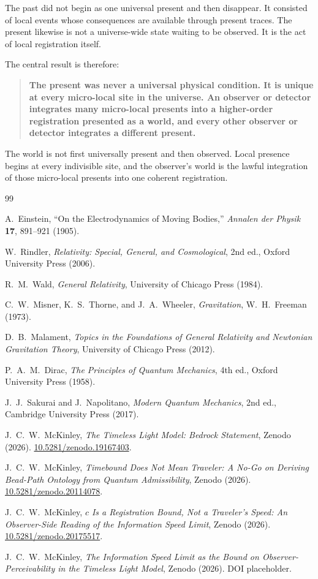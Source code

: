 \documentclass[12pt,onecolumn]{article}
\newcommand{\doi}[1]{\href{https://doi.org/#1}{#1}}
\begin{document}
The past did not begin as one universal present and then disappear. It consisted of local events whose consequences are available through present traces. The present likewise is not a universe-wide state waiting to be observed. It is the act of local registration itself.

The central result is therefore:

\begin{quote}
\textbf{The present was never a universal physical condition. It is unique at every micro-local site in the universe. An observer or detector integrates many micro-local presents into a higher-order registration presented as a world, and every other observer or detector integrates a different present.}
\end{quote}

The world is not first universally present and then observed. Local presence begins at every indivisible site, and the observer's world is the lawful integration of those micro-local presents into one coherent registration.

\begin{thebibliography}{99}

A.~Einstein,
``On the Electrodynamics of Moving Bodies,''
\emph{Annalen der Physik} \textbf{17}, 891--921 (1905).

W.~Rindler,
\emph{Relativity: Special, General, and Cosmological},
2nd ed.,
Oxford University Press (2006).

R.~M.~Wald,
\emph{General Relativity},
University of Chicago Press (1984).

C.~W.~Misner, K.~S.~Thorne, and J.~A.~Wheeler,
\emph{Gravitation},
W.~H.~Freeman (1973).

D.~B.~Malament,
\emph{Topics in the Foundations of General Relativity and Newtonian Gravitation Theory},
University of Chicago Press (2012).

P.~A.~M.~Dirac,
\emph{The Principles of Quantum Mechanics},
4th ed.,
Oxford University Press (1958).

J.~J.~Sakurai and J.~Napolitano,
\emph{Modern Quantum Mechanics},
2nd ed.,
Cambridge University Press (2017).

J.~C.~W.~McKinley,
\emph{The Timeless Light Model: Bedrock Statement},
Zenodo (2026).
\doi{10.5281/zenodo.19167403}.

J.~C.~W.~McKinley,
\emph{Timebound Does Not Mean Traveler:
A No-Go on Deriving Bead-Path Ontology from Quantum Admissibility},
Zenodo (2026).
\doi{10.5281/zenodo.20114078}.

J.~C.~W.~McKinley,
\emph{\(c\) Is a Registration Bound, Not a Traveler's Speed:
An Observer-Side Reading of the Information Speed Limit},
Zenodo (2026).
\doi{10.5281/zenodo.20175517}.

J.~C.~W.~McKinley,
\emph{The Information Speed Limit as the Bound on Observer-Perceivability
in the Timeless Light Model},
Zenodo (2026).
DOI placeholder.

\end{thebibliography}
\end{document}
